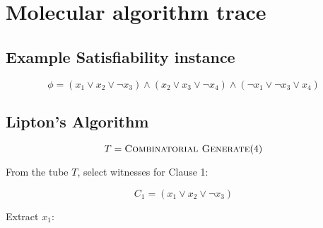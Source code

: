 
\chapter{Molecular algorithm trace}


\section{Example {\sc Satisfiability} instance}

\[
 \phi = (x_1 \vee x_2 \vee \neg x_3) \wedge  (x_2 \vee x_3 \vee \neg x_4) \wedge (\neg x_1 \vee \neg x_3 \vee x_4)
\]



\section{Lipton's Algorithm}

\[
T  = \text{{\sc Combinatorial Generate}}(4)
\]

\begin{center}
\end{center}

	
From the tube $T$, select witnesses for Clause 1:

\[
C_1 = (x_1 \vee x_2 \vee \neg x_3)
\]

	Extract $x_1$:


